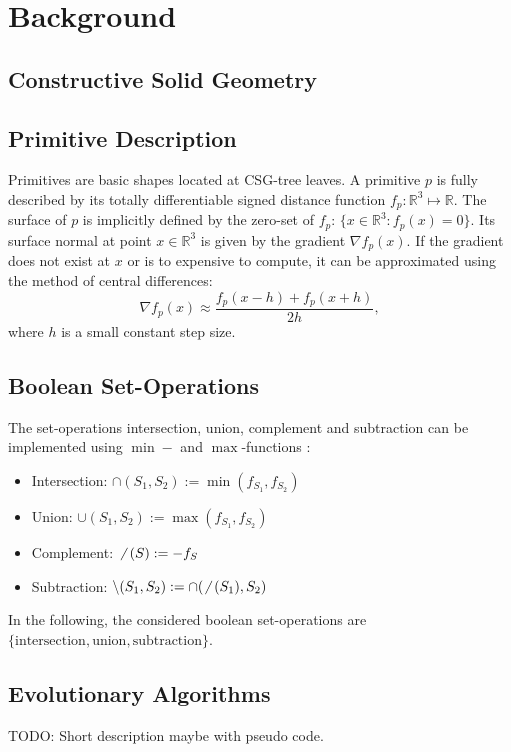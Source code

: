 \section{Background}
\subsection{Constructive Solid Geometry} 

\subsection{Primitive Description}
Primitives are basic shapes located at \ac{CSG}-tree leaves. 
A primitive $p$ is fully described by its totally differentiable signed distance function $f_p: \mathbb{R}^3 \mapsto \mathbb{R}$.
The surface of $p$ is implicitly defined by the zero-set of $f_p$: $\{x \in \mathbb{R}^3 : f_p(x)=0\}$.
Its surface normal at point $x \in \mathbb{R}^3$ is given by the gradient $\nabla f_p(x)$.
If the gradient does not exist at $x$ or is to expensive to compute, it can be approximated using the method of central differences:
\begin{equation}
\nabla f_p(x) \approx \frac{f_p(x - h) + f_p(x + h)}{2h},
\end{equation}
where $h$ is a small constant step size.
\\
\subsection{Boolean Set-Operations}
The set-operations intersection, union, complement and subtraction can be implemented using $\min-$ and $\max$-functions \cite{ricci197constgeo}: 
\begin{itemize}
	\item Intersection: $\cap(S_1,S_2) := \min(f_{S_1}, f_{S_2})$
	\item Union: $\cup(S_1,S_2) := \max(f_{S_1}, f_{S_2})$
	\item Complement: $\not \enskip(S) := -f_S$
	\item Subtraction: $\setminus(S_1,S_2) := \cap(\not \enskip(S_1), S_2)$%
\end{itemize}
In the following, the considered boolean set-operations are $\{\text{intersection}, \text{union}, \text{subtraction}\}$.
\subsection{Evolutionary Algorithms} 
TODO: Short description maybe with pseudo code.
\\
